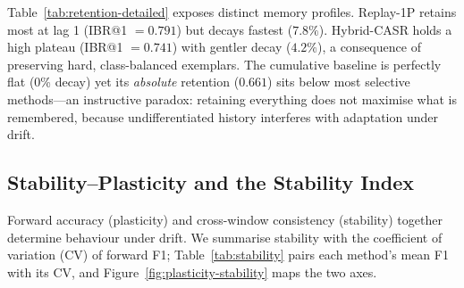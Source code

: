 \documentclass[a4paper,twoside]{article}
\begin{document}
Table~\ref{tab:retention-detailed} exposes distinct memory profiles. Replay-1P retains most at lag 1 (IBR@1 $=0.791$) but decays fastest ($7.8\%$). Hybrid-CASR holds a high plateau (IBR@1 $=0.741$) with gentler decay ($4.2\%$), a consequence of preserving hard, class-balanced exemplars. The cumulative baseline is perfectly flat (0\% decay) yet its \emph{absolute} retention ($0.661$) sits below most selective methods---an instructive paradox: retaining everything does not maximise what is remembered, because undifferentiated history interferes with adaptation under drift.

\subsection{Stability--Plasticity and the Stability Index}
\label{sec:stability}

\noindent
Forward accuracy (plasticity) and cross-window consistency (stability) together determine behaviour under drift. We summarise stability with the coefficient of variation (CV) of forward F1; Table~\ref{tab:stability} pairs each method's mean F1 with its CV, and Figure~\ref{fig:plasticity-stability} maps the two axes.

\begin{table}[t]
  \centering
  \caption{Stability index (coefficient of variation of forward F1) against mean forward F1 on common windows. Lower CV is steadier. Newly added in this extended version.}
  \label{tab:stability}
\end{table}
\end{document}
